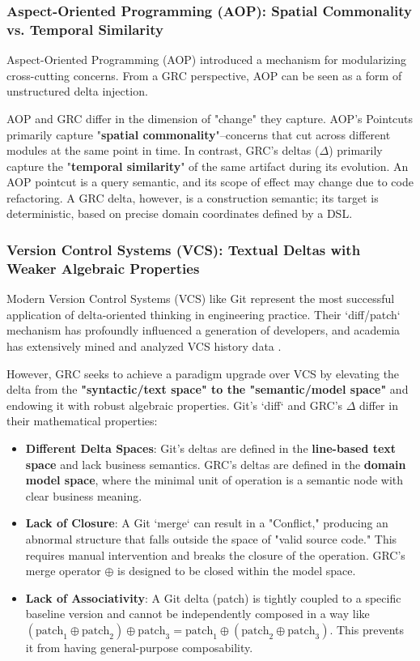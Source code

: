 \documentclass[11pt]{article}
\begin{document}
\subsubsection{Aspect-Oriented Programming (AOP): Spatial Commonality vs. Temporal Similarity}

Aspect-Oriented Programming (AOP) \cite{kiczales1997} introduced a mechanism for modularizing cross-cutting concerns. From a GRC perspective, AOP can be seen as a form of unstructured delta injection.

AOP and GRC differ in the dimension of "change" they capture. AOP's Pointcuts primarily capture "\textbf{spatial commonality}"--concerns that cut across different modules at the same point in time. In contrast, GRC's deltas ($\Delta$) primarily capture the "\textbf{temporal similarity}" of the same artifact during its evolution. An AOP pointcut is a query semantic, and its scope of effect may change due to code refactoring. A GRC delta, however, is a construction semantic; its target is deterministic, based on precise domain coordinates defined by a DSL.

\subsubsection{Version Control Systems (VCS): Textual Deltas with Weaker Algebraic Properties}

Modern Version Control Systems (VCS) like Git represent the most successful application of delta-oriented thinking in engineering practice. Their `diff/patch` mechanism has profoundly influenced a generation of developers, and academia has extensively mined and analyzed VCS history data \cite{gousios2013}.

However, GRC seeks to achieve a paradigm upgrade over VCS by elevating the delta from the \textbf{"syntactic/text space" to the "semantic/model space"} and endowing it with robust algebraic properties. Git's `diff` and GRC's $\Delta$ differ in their mathematical properties:
\begin{itemize}
    \item \textbf{Different Delta Spaces}: Git's deltas are defined in the \textbf{line-based text space} and lack business semantics. GRC's deltas are defined in the \textbf{domain model space}, where the minimal unit of operation is a semantic node with clear business meaning.
    \item \textbf{Lack of Closure}: A Git `merge` can result in a "Conflict," producing an abnormal structure that falls outside the space of "valid source code." This requires manual intervention and breaks the closure of the operation. GRC's merge operator $\oplus$ is designed to be closed within the model space.
    \item \textbf{Lack of Associativity}: A Git delta (patch) is tightly coupled to a specific baseline version and cannot be independently composed in a way like $(\text{patch}_1 \oplus \text{patch}_2) \oplus \text{patch}_3 = \text{patch}_1 \oplus (\text{patch}_2 \oplus \text{patch}_3)$. This prevents it from having general-purpose composability.
\end{itemize}
\end{document}
